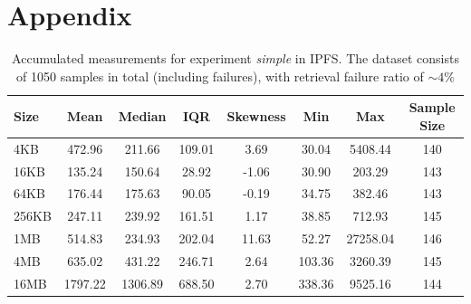 \chapter{Appendix}\label{chapter:appendix}

\begin{table}[H]
\centering
\begin{small}
\caption{Accumulated measurements for experiment \textit{simple} in IPFS. The dataset consists of 1050 samples in total (including failures), with retrieval failure ratio of $\sim 4\%$ }
\label{tab:normal}
\begin{tabular}{@{}lccccccc@{}}
\toprule
Size & Mean & Median & IQR & Skewness & Min & Max & Sample Size \\ \midrule
4KB & 472.96 & 211.66 & 109.01 & 3.69 & 30.04 & 5408.44 & 140\\
16KB & 135.24 & 150.64 & 28.92 & -1.06 & 30.90 & 203.29 & 143\\
64KB & 176.44 & 175.63 & 90.05 & -0.19 & 34.75 & 382.46 & 143\\
256KB & 247.11 & 239.92 & 161.51 & 1.17 & 38.85 & 712.93 & 145\\
1MB & 514.83 & 234.93 & 202.04 & 11.63 & 52.27 & 27258.04 & 146\\
4MB & 635.02 & 431.22 & 246.71 & 2.64 & 103.36 & 3260.39 & 145\\
16MB & 1797.22 & 1306.89 & 688.50 & 2.70 & 338.36 & 9525.16 & 144\\
\bottomrule
\end{tabular}
\end{small}
\end{table}


\begin{table}[H]
\centering
\caption{Accumulated measurements for each experiment in Swarm without outliers.}
\end{table}


